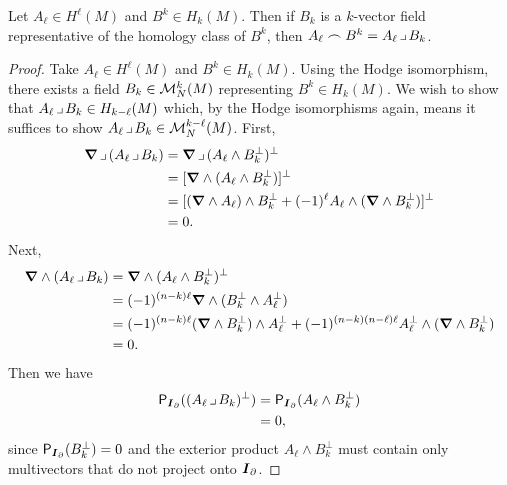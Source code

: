 \documentclass{article}
\begin{document}
\begin{theorem}
\label{thm:cap}
Let $A_\ell \in H^\ell(M)$ and $B^k \in H_k(M)$. Then if $B_k$ is a $k$-vector field representative of the homology class of $B^k$, then $A_\ell \frown B^k = A_\ell \hspace*{.5mm}\lrcorner \hspace*{.5mm} B_k$.
\end{theorem}
\begin{proof}
Take $A_\ell\in H^\ell(M)$ and $B^k \in H_k(M)$. Using the Hodge isomorphism, there exists a field $B_k \in \mathcal{M}^k_N(M)$ representing $B^k \in H_k(M)$. We wish to show that $A_\ell \hspace*{.5mm}\lrcorner \hspace*{.5mm} B_k \in H_{k-\ell}(M)$ which, by the Hodge isomorphisms again, means it suffices to show $A_\ell \hspace*{.5mm}\lrcorner \hspace*{.5mm} B_k \in \mathcal{M}^{k-\ell}_N(M)$. First,
\begin{align}
    \boldsymbol{\nabla} \hspace*{.5mm}\lrcorner \hspace*{.5mm} (A_\ell \hspace*{.5mm}\lrcorner \hspace*{.5mm} B_k) &= \boldsymbol{\nabla} \hspace*{.5mm}\lrcorner \hspace*{.5mm} (A_\ell \wedge B_k^\perp)^\perp\\
    &= [\boldsymbol{\nabla} \wedge (A_\ell \wedge B_k^\perp)]^\perp\\
    &= [(\boldsymbol{\nabla} \wedge A_\ell)\wedge B_k^\perp +(-1)^\ell A_\ell \wedge (\boldsymbol{\nabla} \wedge B_k^\perp)]^\perp\\
    &= 0.
\end{align}
Next,
\begin{align}
    \boldsymbol{\nabla} \wedge (A_\ell \hspace*{.5mm}\lrcorner \hspace*{.5mm} B_k) &= \boldsymbol{\nabla} \wedge (A_\ell \wedge B_k^\perp)^\perp\\
    &= (-1)^{(n-k)\ell}\boldsymbol{\nabla} \wedge (B_k^\perp \wedge A_\ell^\perp)\\
    &= (-1)^{(n-k)\ell}(\boldsymbol{\nabla} \wedge B_k^\perp)\wedge A_\ell^\perp +(-1)^{(n-k)(n-\ell)\ell} A_\ell^\perp \wedge (\boldsymbol{\nabla} \wedge B_k^\perp)\\
    &= 0.
\end{align}
Then we have
\begin{align}
    \mathsf{P}_{\boldsymbol{I}_\partial}((A_\ell \hspace*{.5mm}\lrcorner \hspace*{.5mm} B_k)^\perp)&= \mathsf{P}_{\boldsymbol{I}_\partial}(A_\ell \wedge B_k^\perp)\\
    &=0,
\end{align}
since $\mathsf{P}_{\boldsymbol{I}_\partial}(B_k^\perp)=0$ and the exterior product $A_\ell \wedge B_k^\perp$ must contain only multivectors that do not project onto $\boldsymbol{I}_\partial$.
\end{proof}
\end{document}
